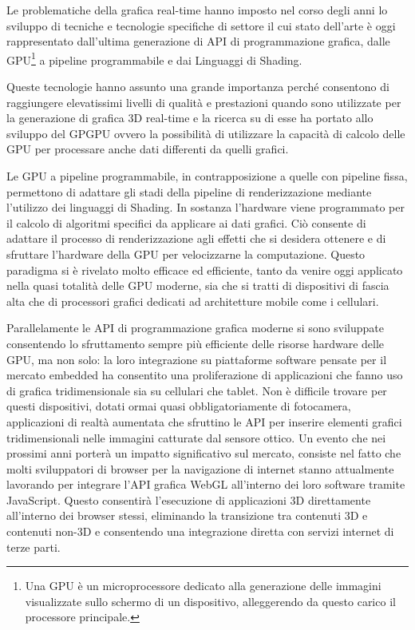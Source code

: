 Le problematiche della grafica real-time hanno imposto nel corso degli anni lo sviluppo di tecniche e tecnologie specifiche di settore il cui stato dell'arte \`e oggi rappresentato dall'ultima generazione di \ac{API} di programmazione grafica, dalle \ac{GPU}\footnote{Una \ac{GPU} \`e un microprocessore dedicato alla generazione delle immagini visualizzate sullo schermo di un dispositivo, alleggerendo da questo carico il processore principale.} a pipeline programmabile e dai Linguaggi di Shading.

Queste tecnologie hanno assunto una grande importanza perch\'e consentono di raggiungere elevatissimi livelli di qualit\`a e prestazioni quando sono utilizzate per la generazione di grafica 3D real-time e la ricerca su di esse ha portato allo sviluppo del \ac{GPGPU} ovvero la possibilit\`a di utilizzare la capacit\`a di calcolo delle \ac{GPU} per processare anche dati differenti da quelli grafici.

Le \ac{GPU} a pipeline programmabile, in contrapposizione a quelle con pipeline fissa, permettono di adattare gli stadi della pipeline di renderizzazione mediante l'utilizzo dei linguaggi di Shading. In sostanza l'hardware viene programmato per il calcolo di algoritmi specifici da applicare ai dati grafici. Ci\`o consente di adattare il processo di renderizzazione agli effetti che si desidera ottenere e di sfruttare l'hardware della \ac{GPU} per velocizzarne la computazione. 
Questo paradigma si \`e rivelato molto efficace ed efficiente, tanto da venire oggi applicato nella quasi totalit\`a delle \ac{GPU} moderne, sia che si tratti di dispositivi di fascia alta che di processori grafici dedicati ad architetture mobile come i cellulari.

Parallelamente le \ac{API} di programmazione grafica moderne si sono sviluppate consentendo lo sfruttamento sempre pi\`u efficiente delle risorse hardware delle \ac{GPU}, ma non solo: la loro integrazione su piattaforme software pensate per il mercato embedded ha consentito una proliferazione di applicazioni che fanno uso di grafica tridimensionale sia su cellulari che tablet.
Non \`e difficile trovare per questi dispositivi, dotati ormai quasi obbligatoriamente di fotocamera, applicazioni di realt\`a aumentata che sfruttino le \ac{API} per inserire elementi grafici tridimensionali nelle immagini catturate dal sensore ottico.
Un evento che nei prossimi anni porter\`a un impatto significativo sul mercato, consiste nel fatto che molti sviluppatori di browser per la navigazione di internet stanno attualmente lavorando per integrare l'\ac{API} grafica WebGL all'interno dei loro software tramite JavaScript. Questo consentir\`a l'esecuzione di applicazioni 3D direttamente all'interno dei browser stessi, eliminando la transizione tra contenuti 3D e contenuti non-3D e consentendo una integrazione diretta con servizi internet di terze parti.

